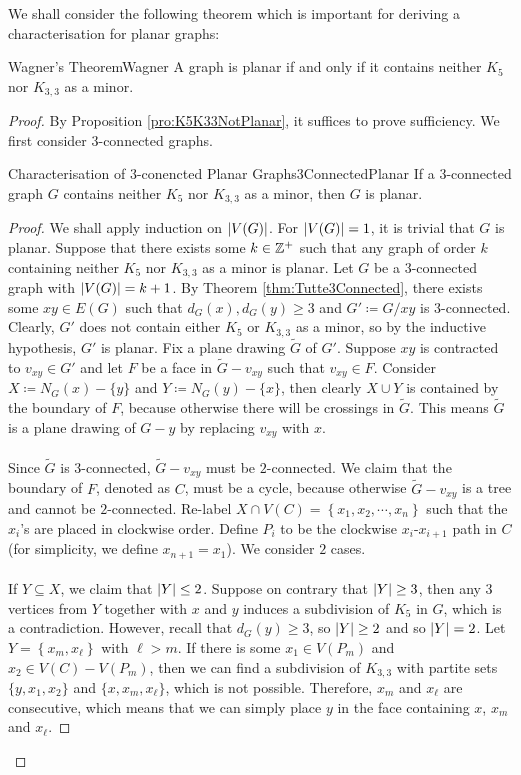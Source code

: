 \documentclass[math]{amznotes}
\theoremstyle{remark}
\newcommand{\0}{\mathbf{0}}
\newcommand{\1}{\mathbf{1}}
\begin{document}
We shall consider the following theorem which is important for deriving a characterisation for planar graphs:
\begin{thmbox}{Wagner's Theorem}{Wagner}
    A graph is planar if and only if it contains neither $K_5$ nor $K_{3, 3}$ as a minor.
    \tcblower
    \begin{proof}
        By Proposition \ref{pro:K5K33NotPlanar}, it suffices to prove sufficiency. We first consider $3$-connected graphs.
        \begin{lembox}{Characterisation of $3$-conencted Planar Graphs}{3ConnectedPlanar}
            If a $3$-connected graph $G$ contains neither $K_5$ nor $K_{3, 3}$ as a minor, then $G$ is planar.
            \tcblower
            \begin{proof}
                We shall apply induction on ${\left\lvert {V(G)} \right\rvert}$. For ${\left\lvert {V(G)} \right\rvert} = 1$, it is trivial that $G$ is planar. Suppose that there exists some $k \in \mathbb{Z}^+$ such that any graph of order $k$ containing neither $K_5$ nor $K_{3, 3}$ as a minor is planar. Let $G$ be a $3$-connected graph with ${\left\lvert {V(G)} \right\rvert} = k + 1$. By Theorem \ref{thm:Tutte3Connected}, there exists some $xy \in E(G)$ such that $d_G(x), d_G(y) \geq 3$ and $G' \coloneqq G/xy$ is $3$-connected. Clearly, $G'$ does not contain either $K_5$ or $K_{3, 3}$ as a minor, so by the inductive hypothesis, $G'$ is planar. Fix a plane drawing $\tilde{G}$ of $G'$. Suppose $xy$ is contracted to $v_{xy} \in G'$ and let $F$ be a face in $\tilde{G} - v_{xy}$ such that $v_{xy} \in F$. Consider $X \coloneqq N_G(x) - \{y\}$ and $Y \coloneqq N_G(y) - \{x\}$, then clearly $X \cup Y$ is contained by the boundary of $F$, because otherwise there will be crossings in $\tilde{G}$. This means $\tilde{G}$ is a plane drawing of $G - y$ by replacing $v_{xy}$ with $x$.
                \\\\ 
                Since $\tilde{G}$ is $3$-connected, $\tilde{G} - v_{xy}$ must be $2$-connected. We claim that the boundary of $F$, denoted as $C$, must be a cycle, because otherwise $\tilde{G} - v_{xy}$ is a tree and cannot be $2$-connected. Re-label $X \cap V(C) = \left\{x_1, x_2, \cdots, x_n\right\}$ such that the $x_i$'s are placed in clockwise order. Define $P_i$ to be the clockwise $x_i$-$x_{i + 1}$ path in $C$ (for simplicity, we define $x_{n + 1} = x_1$). We consider $2$ cases.
                \\\\
                If $Y \subseteq X$, we claim that ${\left\lvert {Y} \right\rvert} \leq 2$. Suppose on contrary that ${\left\lvert {Y} \right\rvert} \geq 3$, then any $3$ vertices from $Y$ together with $x$ and $y$ induces a subdivision of $K_5$ in $G$, which is a contradiction. However, recall that $d_G(y) \geq 3$, so ${\left\lvert {Y} \right\rvert} \geq 2$ and so ${\left\lvert {Y} \right\rvert} = 2$. Let $Y = \left\{x_m, x_{\ell}\right\}$ with $\ell > m$. If there is some $x_1 \in V(P_m)$ and $x_2 \in V(C) - V(P_m)$, then we can find a subdivision of $K_{3, 3}$ with partite sets $\{y, x_1, x_2\}$ and $\{x, x_m, x_{\ell}\}$, which is not possible. Therefore, $x_m$ and $x_{\ell}$ are consecutive, which means that we can simply place $y$ in the face containing $x$, $x_m$ and $x_{\ell}$.

\end{proof}
\end{lembox}
\end{proof}
\end{thmbox}
\end{document}
